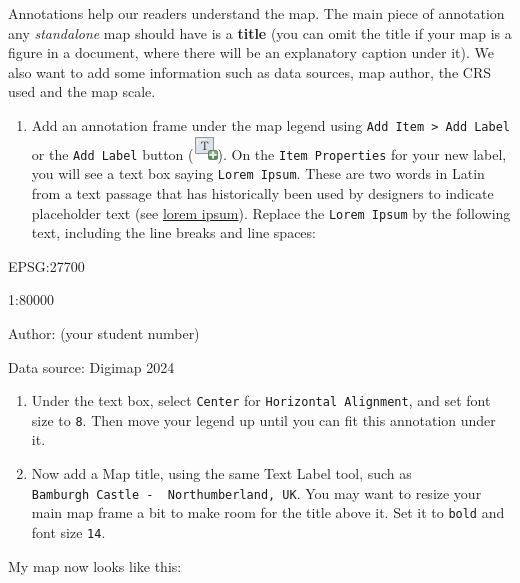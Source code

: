 \documentclass[
  letterpaper,
  DIV=11,
  numbers=noendperiod]{scrreprt}
\providecommand{\tightlist}{%
  \setlength{\itemsep}{0pt}\setlength{\parskip}{0pt}}\usepackage{longtable,booktabs,array}
\begin{document}
Annotations help our readers understand the map. The main piece of
annotation any \emph{standalone} map should have is a \textbf{title}
(you can omit the title if your map is a figure in a document, where
there will be an explanatory caption under it). We also want to add some
information such as data sources, map author, the CRS used and the map
scale.

\begin{enumerate}
\def\labelenumi{(\arabic{enumi})}
\setcounter{enumi}{264}
\tightlist
\item
  Add an annotation frame under the map legend using
  \texttt{Add\ Item\ \textgreater{}\ Add\ Label} or the
  \texttt{Add\ Label} button
  (\includegraphics{index_files/mediabag/mActionLabel.png}). On the
  \texttt{Item\ Properties} for your new label, you will see a text box
  saying \texttt{Lorem\ Ipsum}. These are two words in Latin from a text
  passage that has historically been used by designers to indicate
  placeholder text (see
  \href{https://en.wikipedia.org/wiki/Lorem_ipsum}{lorem ipsum}).
  Replace the \texttt{Lorem\ Ipsum} by the following text, including the
  line breaks and line spaces:
\end{enumerate}

EPSG:27700

1:80000

Author: (your student number)

Data source: Digimap 2024

\begin{enumerate}
\def\labelenumi{(\arabic{enumi})}
\setcounter{enumi}{265}
\item
  Under the text box, select \texttt{Center} for
  \texttt{Horizontal\ Alignment}, and set font size to \texttt{8}. Then
  move your legend up until you can fit this annotation under it.
\item
  Now add a Map title, using the same Text Label tool, such as
  \texttt{Bamburgh\ Castle\ -\ \ Northumberland,\ UK}. You may want to
  resize your main map frame a bit to make room for the title above it.
  Set it to \texttt{bold} and font size \texttt{14}.
\end{enumerate}

My map now looks like this:
\end{document}
